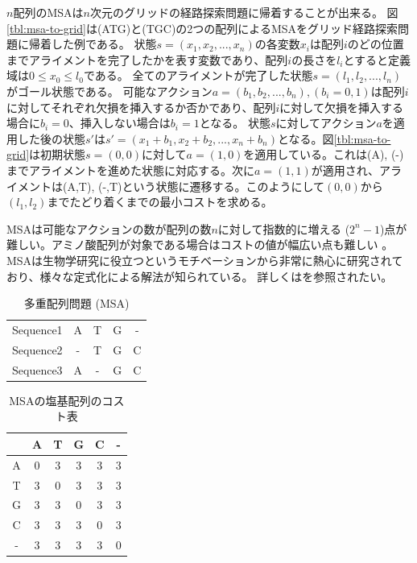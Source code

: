 $n$配列のMSAは$n$次元のグリッドの経路探索問題に帰着することが出来る\cite{korf:2000}。
図\ref{tbl:msa-to-grid}は(ATG)と(TGC)の2つの配列によるMSAをグリッド経路探索問題に帰着した例である。
状態$s = (x_1, x_2,...,x_n)$の各変数$x_i$は配列$i$のどの位置までアライメントを完了したかを表す変数であり、配列$i$の長さを$l_i$とすると定義域は$0 \leq x_0 \leq l_0$である。
全てのアライメントが完了した状態$s=(l_1, l_2,...,l_n)$がゴール状態である。
可能なアクション$a=(b_1, b_2, ..., b_n), (b_i=0, 1)$は配列$i$に対してそれぞれ欠損を挿入するか否かであり、配列$i$に対して欠損を挿入する場合に$b_i=0$、挿入しない場合は$b_i=1$となる。
状態$s$に対してアクション$a$を適用した後の状態$s'$は$s'=(x_1+b_1, x_2+b_2,..., x_n+b_n)$となる。図\ref{tbl:msa-to-grid}は初期状態$s=(0,0)$に対して$a=(1,0)$を適用している。これは(A), (-)までアライメントを進めた状態に対応する。次に$a=(1,1)$が適用され、アライメントは(A,T), (-,T)という状態に遷移する。このようにして$(0, 0)$から$(l_1, l_2)$までたどり着くまでの最小コストを求める。

MSAは可能なアクションの数が配列の数$n$に対して指数的に増える ($2^n-1$)点が難しい。アミノ酸配列が対象である場合はコストの値が幅広い点も難しい \cite{pearson1990}。
MSAは生物学研究に役立つというモチベーションから非常に熱心に研究されており、様々な定式化による解法が知られている。
詳しくは\cite{waterman1995introduction,
gusfield1997algorithms,edgar2006multiple}を参照されたい。

\begin{table}
  \centering
  \caption{多重配列問題 (MSA)}
  \begin{tabular}{c|cccc}
    \toprule
	Sequence1 & A & T & G & - \\
	Sequence2 & - & T & G & C \\
	Sequence3 & A & - & G & C \\
        \bottomrule
\end{tabular}
\label{tbl:msa}
\end{table}

\begin{table}
  \centering
\caption{MSAの塩基配列のコスト表}
\begin{tabular}{c|ccccc}
  \toprule
	  & A & T & G & C & - \\ \midrule
	A & 0 & 3 & 3 & 3 & 3 \\
	T & 3 & 0 & 3 & 3 & 3 \\
	G & 3 & 3 & 0 & 3 & 3 \\
	C & 3 & 3 & 3 & 0 & 3 \\
	- & 3 & 3 & 3 & 3 & 0 \\
        \bottomrule
\end{tabular}
\label{tbl:msa-cost}
\end{table}

